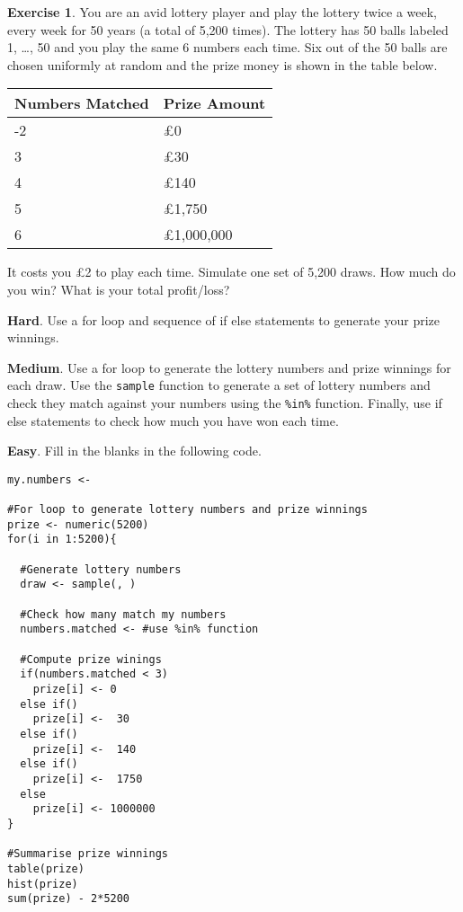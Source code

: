 \documentclass[
]{book}
\theoremstyle{definition}
\theoremstyle{definition}
\theoremstyle{definition}
\newtheorem{exercise}{Exercise}[chapter]
\theoremstyle{definition}
\theoremstyle{remark}
\begin{document}
\begin{exercise}

You are an avid lottery player and play the lottery twice a week, every week for 50 years (a total of 5,200 times). The lottery has 50 balls labeled 1, \ldots, 50 and you play the same 6 numbers each time. Six out of the 50 balls are chosen uniformly at random and the prize money is shown in the table below.

\begin{longtable}[]{@{}ll@{}}
\toprule\noalign{}
Numbers Matched & Prize Amount \\
\midrule\noalign{}
\endhead
\bottomrule\noalign{}
\endlastfoot
0-2 & £0 \\
3 & £30 \\
4 & £140 \\
5 & £1,750 \\
6 & £1,000,000 \\
\end{longtable}

It costs you £2 to play each time. Simulate one set of 5,200 draws. How much do you win? What is your total profit/loss?

\textbf{Hard}. Use a for loop and sequence of if else statements to generate your prize winnings.

\textbf{Medium}. Use a for loop to generate the lottery numbers and prize winnings for each draw. Use the \texttt{sample} function to generate a set of lottery numbers and check they match against your numbers using the \texttt{\%in\%} function. Finally, use if else statements to check how much you have won each time.

\textbf{Easy}. Fill in the blanks in the following code.

\begin{verbatim}
my.numbers <- 

#For loop to generate lottery numbers and prize winnings
prize <- numeric(5200)
for(i in 1:5200){
  
  #Generate lottery numbers
  draw <- sample(, )
  
  #Check how many match my numbers
  numbers.matched <- #use %in% function
  
  #Compute prize winings
  if(numbers.matched < 3)
    prize[i] <- 0
  else if()
    prize[i] <-  30
  else if()
    prize[i] <-  140
  else if()
    prize[i] <-  1750
  else
    prize[i] <- 1000000
}

#Summarise prize winnings
table(prize)
hist(prize)
sum(prize) - 2*5200
\end{verbatim}

\end{exercise}
\end{document}

